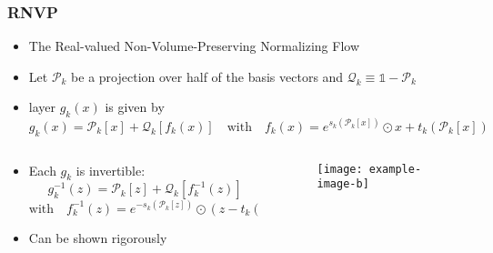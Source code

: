 \begin{frame}
    \frametitle{RNVP}
    \begin{itemize}
        \setlength\itemsep{.6em}
        \item The Real-valued Non-Volume-Preserving Normalizing Flow
        \item Let $\mathcal{P}_k$ be a projection over half of the basis vectors and $\mathcal{Q}_k \equiv \mathbb{1} - \mathcal{P}_k$
        \item layer $g_k(x)$ is given by 
            \begin{equation}
                g_k(x) = \mathcal{P}_k[x] + \mathcal{Q}_k [f_k(x)] \quad \text{with} \quad f_k(x) =  e^{s_k(\mathcal{P}_k[x])} \odot x + t_k(\mathcal{P}_k[x])
                \label{eq:layer_RNVP}
            \end{equation}
    \end{itemize}
    \begin{columns}
        \begin{column}[t]{0.48\textwidth}
            \begin{itemize}
                \item Each $g_k$ is invertible: 
                \[
                    g_k^{-1}(z) = \mathcal{P}_k[z] + \mathcal{Q}_k[f_k^{-1}(z)] 
                \]
                \[ 
                    \text{with} \quad f_k^{-1}(z) =  e^{-s_k(\mathcal{P}_k[z])} \odot (z - t_k(\mathcal{P}_k[z]))
                \]
                \item Can be shown rigorously
            \end{itemize}
        \end{column}

        \begin{column}[t]{0.48\textwidth}
            \begin{figure}
                \texttt{[image: example-image-b]}
            \end{figure} 
        \end{column}
    \end{columns}

\end{frame}